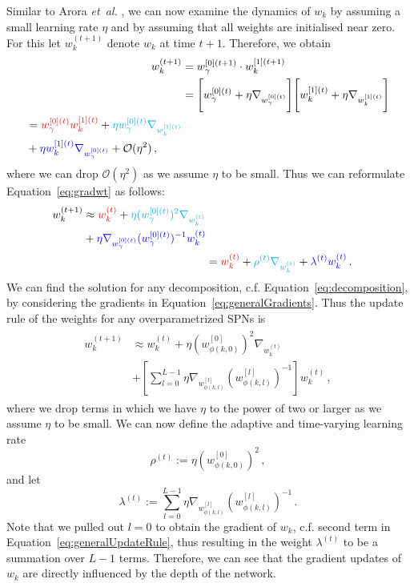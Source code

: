 \documentclass{article}
\newcommand{\wt}{w^{(t)}_{k}}
\newcommand{\wtt}{w^{(t+1)}_{k}}
\newcommand{\wat}{w^{[0](t)}_{\gamma}}
\newcommand{\wbt}{w^{[1](t)}_{k}}
\newcommand{\watt}{w^{[0](t+1)}_{\gamma}}
\newcommand{\wbtt}{w^{[1](t+1)}_{k}}
\begin{document}
Similar to Arora {\it et~al.} \cite{Arora2018}, we can now examine the dynamics of $w_k$ by assuming a small learning rate $\eta$ and by assuming that all weights are initialised near zero.
For this let $\wtt$ denote $w_k$ at time $t+1$. Therefore, we obtain
\begin{align} \label{eq:toyUpdateRule}
  \wtt &= \watt \cdot \wbtt \\
  &= \Bigg[ \wat + \eta \nabla_{\wat} \Bigg] \Bigg[ \wbt + \eta \nabla_{\wbt} \Bigg] \\
\begin{split}
  &= \color{red} \wat \wbt \color{black} + \color{cyan} \eta \wat \nabla_{\wbt}  \\
  &+ \color{blue} \eta \wbt \nabla_{\wat} \color{black} + \mathcal{O}(\eta^2) \, ,
\end{split}\label{eq:gradwt}
\end{align}
where we can drop $\mathcal{O}(\eta^2)$ as we assume $\eta$ to be small.
Thus we can reformulate Equation~\ref{eq:gradwt} as follows:
\begin{align}
\begin{split}
  \wtt &\approx \color{red} \wt \color{black} + \color{cyan} \eta (\wat)^{2}\nabla_{\wt} \\
  &+ \color{blue} \eta \nabla_{\wat} (\wat)^{-1} \wt
\end{split} \\
  &= \color{red} \wt \color{black} + \color{cyan} \rho^{(t)} \nabla_{\wt} \color{black} + \color{blue} \lambda^{(t)} \wt \,\color{black} .
\end{align}
We can find the solution for any decomposition, c.f. Equation~\ref{eq:decomposition},  by considering the gradients in Equation~\ref{eq:generalGradients}. 
Thus the update rule of the weights for any overparametrized SPNs is
\begin{align}\label{eq:generalUpdateRule}
  \begin{aligned}
  \wtt &\approx \wt + \eta (w^{[0]}_{\phi(k, 0)})^{2}\nabla_{\wt} \\
  &+ \left[ \sum_{l=0}^{L-1} \eta \nabla_{w^{[l]}_{\phi(k, l)}} (w^{[l]}_{\phi(k, l)})^{-1} \right] \wt \, ,
  \end{aligned}
\end{align}
where we drop terms in which we have $\eta$ to the power of two or larger as we assume $\eta$ to be small.
We can now define the adaptive and time-varying learning rate
\[
\rho^{(t)} := \eta (w^{[0]}_{\phi(k, 0)})^{2} \, ,
\]
and let
\[
\lambda^{(t)} := \sum_{l=0}^{L-1} \eta \nabla_{w^{[l]}_{\phi(k, l)}} (w^{[l]}_{\phi(k, l)})^{-1} \, .
\]
Note that we pulled out $l=0$ to obtain the gradient of $w_k$, c.f. second term in Equation~\ref{eq:generalUpdateRule}, thus resulting in the weight $\lambda^{(t)}$ to be a summation over $L-1$ terms.
Therefore, we can see that the gradient updates of $w_k$ are directly influenced by the depth of the network.
\end{document}
